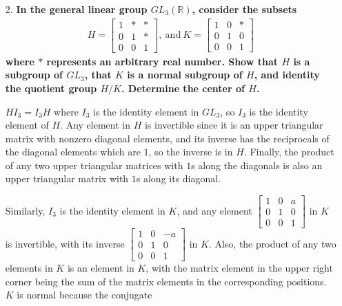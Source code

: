 \documentclass[a4paper,12pt]{article}
\begin{document}
\begin{enumerate}
    \item[2.]
        \boldmath
        \textbf{In the general linear group $GL_3(\mathbb{R})$, consider the subsets
        \begin{align*}
            H = \left[ \begin{array}{ccc}
                    1 & * & * \\
                    0 & 1 & * \\
                    0 & 0 & 1
            \end{array} \right]
            ,\ \text{and}\ 
            K = \left[ \begin{array}{ccc}
                    1 & 0 & * \\
                    0 & 1 & 0 \\
                    0 & 0 & 1
            \end{array} \right]
        \end{align*}
        where $*$ represents an arbitrary real number. Show that $H$ is a subgroup of $GL_3$, that $K$ is a normal subgroup of $H$, and identity the quotient group $H/K$. Determine the center of $H$.} \par
        \unboldmath
        $HI_3 = I_3H$ where $I_3$ is the identity element in $GL_3$, so $I_3$ is the identity element of $H$. Any element in $H$ is invertible since it is an upper triangular matrix with nonzero diagonal elements, and its inverse has the reciprocals of the diagonal elements which are $1$, so the inverse is in $H$. Finally, the product of any two upper triangular matrices with $1$s along the diagonals is also an upper triangular matrix with $1$s along its diagonal. \par
        Similarly, $I_3$ is the identity element in $K$, and any element $\left[ \begin{array}{ccc} 1 & 0 & a \\ 0 & 1 & 0 \\ 0 & 0 & 1 \end{array} \right]$ in $K$ is invertible, with its inverse $\left[ \begin{array}{ccc} 1 & 0 & -a \\ 0 & 1 & 0 \\ 0 & 0 & 1 \end{array} \right]$ in $K$. Also, the product of any two elements in $K$ is an element in $K$, with the matrix element in the upper right corner being the sum of the matrix elements in the corresponding positions. $K$ is normal because the conjugate
        \begin{align*}

\end{align*}
\end{enumerate}
\end{document}
